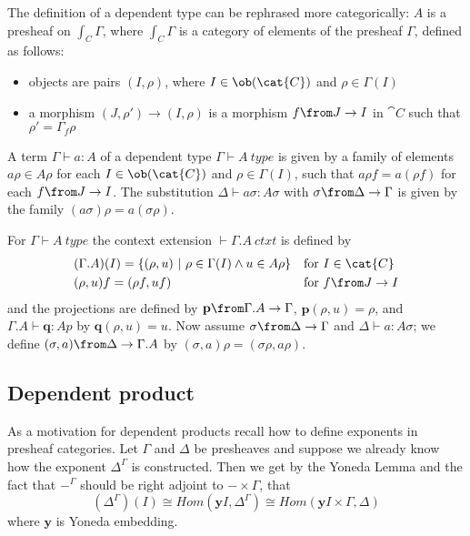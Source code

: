 The definition of a dependent type can be rephrased more categorically: $A$ is
a presheaf on $\int_C \Gamma$, where $\int_C \Gamma$ is a category of elements
of the presheaf $\Gamma$, defined as follows:
\begin{itemize}
  \item objects are pairs $(I, \rho)$, where $I \in \ob(\cat{C})$ and $\rho \in
    \Gamma(I)$
  \item a morphism $(J, \rho') \to (I, \rho)$ is a morphism $f \from J \to I$
    in $\cat{C}$ such that $\rho' = \Gamma_f \rho$
\end{itemize}

A term $\Gamma \vdash a : A$ of a dependent type $\Gamma \vdash A~type$ is
given by a family of elements $a \rho \in A \rho$ for each $I \in \ob(\cat{C})$
and $\rho \in \Gamma(I)$, such that $a \rho f = a (\rho f)$ for each $f \from J
\to I$. The substitution $\Delta \vdash a \sigma : A \sigma$ with $\sigma \from
\Delta \to \Gamma$ is given by the family $(a \sigma) \rho = a (\sigma \rho)$.

For $\Gamma \vdash A~type$ the context extension $\vdash \Gamma.A~ctxt$ is
defined by
\begin{align*}
  &(\Gamma.A)(I) = \{(\rho, u)~|~\rho \in \Gamma(I) \land u \in A \rho\} &&
  \text{for $I \in \cat{C}$}\\
  &(\rho, u)f = (\rho f, u f) && \text{for $f \from J \to I$}
\end{align*}
and the projections are defined by $\mathbf{p} \from \Gamma.A \to \Gamma$,
$\mathbf{p}(\rho, u) = \rho$, and $\Gamma.A \vdash \mathbf{q} : Ap$ by
$\mathbf{q}(\rho, u) = u$.  Now assume $\sigma \from \Delta \to \Gamma$ and
$\Delta \vdash a : A\sigma$; we define $(\sigma, a) \from \Delta \to \Gamma.A$
by $(\sigma, a)\rho = (\sigma \rho, a \rho)$.

\subsection*{Dependent product}

As a motivation for dependent products recall how to define exponents in
presheaf categories. Let $\Gamma$ and $\Delta$ be presheaves and suppose we
already know how the exponent $\Delta^\Gamma$ is constructed. Then we get by
the Yoneda Lemma and the fact that $-^\Gamma$ should be right adjoint to $-
\times \Gamma$, that
\[
  (\Delta^\Gamma)(I) \cong Hom(\mathbf{y}I, \Delta^\Gamma) \cong Hom(\mathbf{y}I \times \Gamma, \Delta)
\]
where $\mathbf{y}$ is Yoneda embedding.

